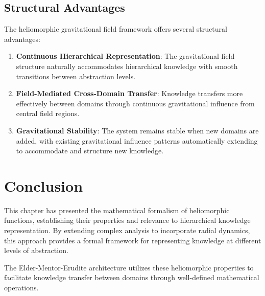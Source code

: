 \subsection{Structural Advantages}

The heliomorphic gravitational field framework offers several structural advantages:

\begin{enumerate}
    \item \textbf{Continuous Hierarchical Representation}: The gravitational field structure naturally accommodates hierarchical knowledge with smooth transitions between abstraction levels.
    
    \item \textbf{Field-Mediated Cross-Domain Transfer}: Knowledge transfers more effectively between domains through continuous gravitational influence from central field regions.
    
    \item \textbf{Gravitational Stability}: The system remains stable when new domains are added, with existing gravitational influence patterns automatically extending to accommodate and structure new knowledge.
\end{enumerate}

\section{Conclusion}

This chapter has presented the mathematical formalism of heliomorphic functions, establishing their properties and relevance to hierarchical knowledge representation. By extending complex analysis to incorporate radial dynamics, this approach provides a formal framework for representing knowledge at different levels of abstraction.

The Elder-Mentor-Erudite architecture utilizes these heliomorphic properties to facilitate knowledge transfer between domains through well-defined mathematical operations.